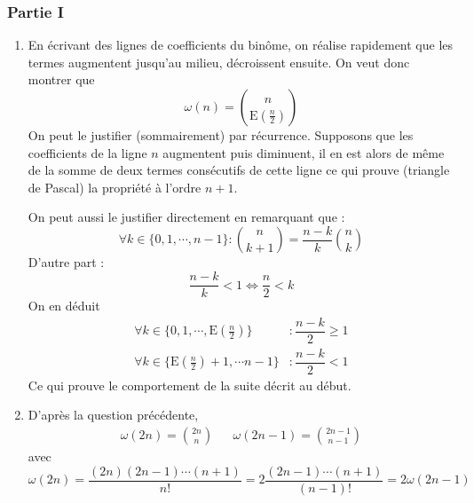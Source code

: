 \subsubsection*{Partie I}
\begin{enumerate}
\item
En {\'e}crivant des lignes de coefficients du bin{\^o}me, on r{\'e}alise rapidement que les termes augmentent jusqu'au milieu, d{\'e}croissent ensuite. On veut donc montrer que 
\begin{displaymath}
 \omega(n)= \binom{n}{\mathrm{E}(\frac{n}{2})}
\end{displaymath}
On peut  le justifier (sommairement) par r{\'e}currence.\newline
Supposons que les coefficients de la ligne $n$ augmentent puis diminuent, il en est alors de m{\^e}me de la somme de deux termes cons{\'e}cutifs de cette ligne ce qui prouve (triangle de Pascal) la propri{\'e}t{\'e} {\`a} l'ordre $n+1$.

On peut aussi le justifier directement en remarquant que :
\begin{displaymath}
 \forall k\in\{0,1,\cdots,n-1\} : \binom{n}{k+1}= \dfrac{n-k}{k}\binom{n}{k}
\end{displaymath}
D'autre part :
\begin{displaymath}
 \dfrac{n-k}{k}<1 \Leftrightarrow \dfrac{n}{2}<k
\end{displaymath}
On en déduit 
\begin{align*}
 \forall k \in\{0,1,\cdots,\mathrm{E}(\frac{n}{2})\} &: \dfrac{n-k}{2}\geq 1 \\
 \forall k \in\{\mathrm{E}(\frac{n}{2})+1, \cdots n-1\} &: \dfrac{n-k}{2}< 1
\end{align*}
Ce qui prouve le comportement de la suite décrit au début.

\item D'apr{\`e}s la question pr{\'e}c{\'e}dente,
\begin{align*}
\omega (2n)=\binom{2n}{n} & & \omega (2n-1)=\binom{2n-1}{n-1} 
\end{align*}
avec
\begin{displaymath}
 \omega (2n)=\frac{(2n)(2n-1)\cdots(n+1)}{n!} = 2 \frac{(2n-1)\cdots(n+1)}{(n-1)!}=2 \omega (2n-1)
\end{displaymath}
\end{enumerate}

